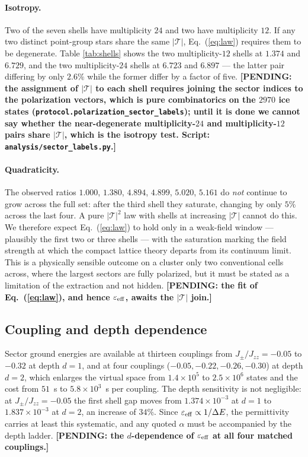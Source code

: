 \documentclass[aps,prb,preprint,amsmath,amssymb,superscriptaddress,
longbibliography,floatfix]{revtex4-2}
\newcommand{\Jzz}{J_{zz}}
\newcommand{\Jpm}{J_{\pm}}
\DeclareRobustCommand{\bT}{\bm{\mathcal T}}
\newcommand{\pending}[1]{{\color{red}\textbf{[PENDING: #1]}}}
\begin{document}
\paragraph{Isotropy.}  Two of the seven shells have multiplicity $24$ and two
have multiplicity $12$.  If any two distinct point-group stars share the same
$|\bT|$, Eq.~(\ref{eq:law}) requires them to be degenerate.  Table
\ref{tab:shells} shows the two multiplicity-$12$ shells at
$1.374$ and $6.729$, and the two multiplicity-$24$ shells at $6.723$ and
$6.897$ --- the latter pair differing by only $2.6\%$ while the former differ
by a factor of five.  \pending{the assignment of $|\bT|$ to each shell requires
joining the sector indices to the polarization vectors, which is pure
combinatorics on the $2970$ ice states
(\texttt{protocol.polarization\_sector\_labels}); until it is done we cannot
say whether the near-degenerate multiplicity-$24$ and multiplicity-$12$ pairs
share $|\bT|$, which is the isotropy test.  Script:
\texttt{analysis/sector\_labels.py}.}

\paragraph{Quadraticity.}  The observed ratios $1.000$, $1.380$, $4.894$,
$4.899$, $5.020$, $5.161$ do \emph{not} continue to grow across the full set:
after the third shell they saturate, changing by only $5\%$ across the last
four.  A pure $|\bT|^2$ law with shells at increasing $|\bT|$ cannot do this.
We therefore expect Eq.~(\ref{eq:law}) to hold only in a weak-field window ---
plausibly the first two or three shells --- with the saturation marking the
field strength at which the compact lattice theory departs from its continuum
limit.  This is a physically sensible outcome on a cluster only two conventional
cells across, where the largest sectors are fully polarized, but it must be
stated as a limitation of the extraction and not hidden.  \pending{the fit of
Eq.~(\ref{eq:law}), and hence $\varepsilon_{\rm eff}$, awaits the $|\bT|$
join.}

\subsection{Coupling and depth dependence}

Sector ground energies are available at thirteen couplings from
$\Jpm/\Jzz=-0.05$ to $-0.32$ at depth $d=1$, and at four couplings
($-0.05,-0.22,-0.26,-0.30$) at depth $d=2$, which enlarges the virtual space
from $1.4\times10^5$ to $2.5\times10^6$ states and the cost from $51$~s to
$5.8\times10^3$~s per coupling.  The depth sensitivity is not negligible: at
$\Jpm/\Jzz=-0.05$ the first shell gap moves from $1.374\times10^{-3}$ at $d=1$
to $1.837\times10^{-3}$ at $d=2$, an increase of $34\%$.  Since
$\varepsilon_{\rm eff}\propto1/\Delta E$, the permittivity carries at least
this systematic, and any quoted $\alpha$ must be accompanied by the depth
ladder.  \pending{the $d$-dependence of $\varepsilon_{\rm eff}$ at all four
matched couplings.}
\end{document}
